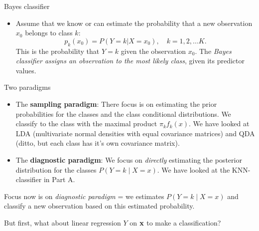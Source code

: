 \documentclass[10pt,ignorenonframetext,]{beamer}
\providecommand{\tightlist}{%
  \setlength{\itemsep}{0pt}\setlength{\parskip}{0pt}}
\begin{document}
\begin{frame}

\begin{block}{Bayes classifier}

\begin{itemize}
\tightlist
\item
  Assume that we know or can estimate the probability that a new
  observation \(x_0\) belongs to class \(k\):
  \[p_k(x_0) = P(Y=k | X=x_0), \quad k = 1, 2, ... K.\] This is the
  probability that \(Y=k\) given the observation \(x_0\). The
  \emph{Bayes classifier assigns an observation to the most likely
  class}, given its predictor values.
\end{itemize}

\end{block}

\end{frame}

\begin{frame}

\begin{block}{Two paradigms}

\begin{itemize}
\item
  The \textbf{sampling paradigm}: There focus is on estimating the prior
  probabilities for the classes and the class conditional distributions.
  We classify to the class with the maximal product \(\pi_k f_k(x)\). We
  have looked at LDA (multivariate normal densities with equal
  covariance matrices) and QDA (ditto, but each class has it's own
  covariance matrix).
\item
  The \textbf{diagnostic paradigm}: We focus on \emph{directly}
  estimating the posterior distribution for the classes
  \(P(Y=k \mid X=x)\). We have looked at the KNN-classifier in Part A.
\end{itemize}

Focus now is on \emph{diagnostic paradigm} = we estimates
\(P(Y=k \mid X=x)\) and classify a new observation based on this
estimated probability.

But first, what about linear regression \(Y\) on \({\bf x}\) to make a
classification?

\end{block}

\end{frame}
\end{document}

